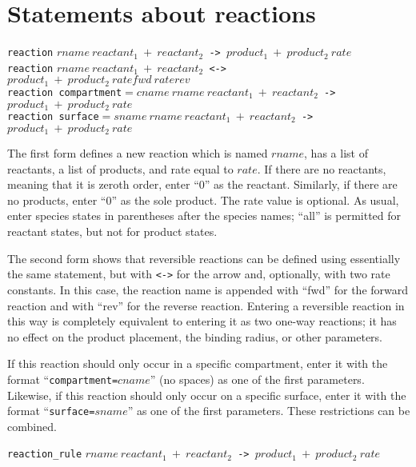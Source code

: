\documentclass {scrbook}
\newcommand {\ttt} {\texttt}
\begin{document}
\section{Statements about reactions}

\begin{description}

\item{\ttt{reaction} $rname\ reactant_1\ +\ reactant_2$\ttt{ -> }$product_1\ +\ product_2\ rate$\\
\ttt{reaction} $rname\ reactant_1\ +\ reactant_2$\ttt{ <-> }$product_1\ +\ product_2\ ratefwd\ raterev$\\
\ttt{reaction compartment}$=cname\ rname\ reactant_1\ +\ reactant_2$\ttt{ -> }$product_1\ +\ product_2\ rate$\\
\ttt{reaction surface}$=sname\ rname\ reactant_1\ +\ reactant_2$\ttt{ -> }$product_1\ +\ product_2\ rate$}

The first form defines a new reaction which is named $rname$, has a list of reactants, a list of products, and rate equal to $rate$. If there are no reactants, meaning that it is zeroth order, enter ``0'' as the reactant. Similarly, if there are no products, enter ``0'' as the sole product. The rate value is optional. As usual, enter species states in parentheses after the species names; ``all'' is permitted for reactant states, but not for product states.

The second form shows that reversible reactions can be defined using essentially the same statement, but with \ttt{<->} for the arrow and, optionally, with two rate constants. In this case, the reaction name is appended with ``fwd'' for the forward reaction and with ``rev'' for the reverse reaction. Entering a reversible reaction in this way is completely equivalent to entering it as two one-way reactions; it has no effect on the product placement, the binding radius, or other parameters.

If this reaction should only occur in a specific compartment, enter it with the format ``\ttt{compartment=}$cname$'' (no spaces) as one of the first parameters. Likewise, if this reaction should only occur on a specific surface, enter it with the format ``\ttt{surface=}$sname$'' as one of the first parameters. These restrictions can be combined.

\item{\ttt{reaction\_rule} $rname\ reactant_1\ +\ reactant_2$\ttt{ -> }$product_1\ +\ product_2\ rate$}


\end{description}
\end{document}
